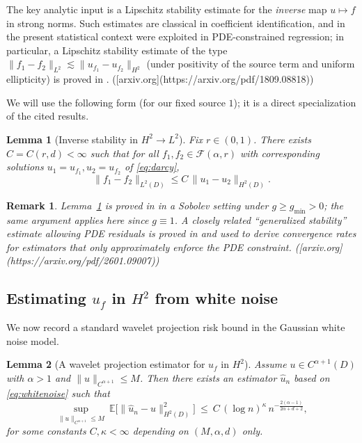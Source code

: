 \documentclass[11pt]{article}
\newtheorem{lemma}{Lemma}
\newtheorem{remark}{Remark}
\newcommand{\D}{D}
\begin{document}
The key analytic input is a Lipschitz stability estimate for the \emph{inverse} map $u\mapsto f$ in strong norms. Such estimates are classical in coefficient identification, and in the present statistical context were exploited in PDE-constrained regression; in particular, a Lipschitz stability estimate of the type $\|f_1-f_2\|_{L^2}\lesssim \|u_{f_1}-u_{f_2}\|_{H^2}$ (under positivity of the source term and uniform ellipticity) is proved in \cite[Lemma 24]{NVW2019}. ([arxiv.org](https://arxiv.org/pdf/1809.08818))

We will use the following form (for our fixed source $1$); it is a direct specialization of the cited results.

\begin{lemma}[Inverse stability in $H^2\to L^2$]\label{lem:stabilityH2}
Fix $r\in(0,1)$. There exists $C=C(r,d)<\infty$ such that for all $f_1,f_2\in\mathcal F(\alpha,r)$ with corresponding solutions $u_1=u_{f_1},u_2=u_{f_2}$ of \eqref{eq:darcy},
\[
\|f_1-f_2\|_{L^2(\D)} \le C\,\|u_1-u_2\|_{H^2(\D)}.
\]
\end{lemma}

\begin{remark}
Lemma~\ref{lem:stabilityH2} is proved in \cite[Lemma 24]{NVW2019} in a Sobolev setting under $g\ge g_{\min}>0$; the same argument applies here since $g\equiv1$. A closely related ``generalized stability'' estimate allowing PDE residuals is proved in \cite[Lemma 2.2]{Wang2026} and used to derive convergence rates for estimators that only approximately enforce the PDE constraint. ([arxiv.org](https://arxiv.org/pdf/2601.09007))
\end{remark}

\subsection{Estimating $u_f$ in $H^2$ from white noise}

We now record a standard wavelet projection risk bound in the Gaussian white noise model.

\begin{lemma}[A wavelet projection estimator for $u_f$ in $H^2$]\label{lem:uH2rate}
Assume $u\in C^{\alpha+1}(\D)$ with $\alpha>1$ and $\|u\|_{C^{\alpha+1}}\le M$. Then there exists an estimator $\hat u_n$ based on \eqref{eq:whitenoise} such that
\[
\sup_{\|u\|_{C^{\alpha+1}}\le M}\ \mathbb E\bigl[\|\hat u_n-u\|_{H^2(\D)}^2\bigr]
\ \le\ C\,(\log n)^{\kappa}\, n^{-\frac{2(\alpha-1)}{2\alpha+d+2}},
\]
for some constants $C,\kappa<\infty$ depending on $(M,\alpha,d)$ only.
\end{lemma}
\end{document}
